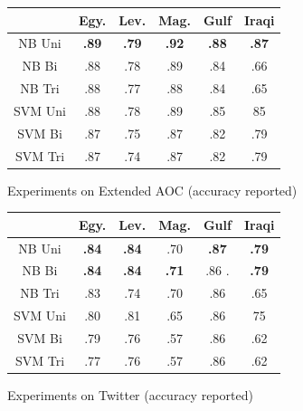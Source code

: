 \documentclass[10pt, a4paper]{article}
\begin{document}
\begin{figure} \centering
\begin{tabular}{|c|c|c|c|c|c|} \hline & Egy. & Lev. & Mag. & Gulf &
Iraqi \\ \hline NB Uni & \textbf{.89} & \textbf{.79} & \textbf{.92} &
\textbf{.88} & \textbf{.87} \\ \hline NB Bi & .88 & .78 & .89 & .84 &
.66 \\ \hline NB Tri & .88 & .77 & .88 & .84 & .65 \\ \hline SVM Uni &
.88 & .78 & .89 & .85 & 85 \\ \hline SVM Bi & .87 & .75 & .87 & .82 &
.79\\ \hline SVM Tri & .87 & .74 & .87 & .82 & .79 \\ \hline
\end{tabular}
\label{exp:newspaper}
\caption{Experiments on Extended AOC (accuracy reported)}
\end{figure}

\begin{figure} \centering
\begin{tabular}{|c|c|c|c|c|c|} \hline & Egy. & Lev. & Mag. & Gulf &
Iraqi \\ \hline NB Uni & \textbf{.84} & \textbf{.84} & .70 &
\textbf{.87} & \textbf{.79} \\ \hline NB Bi & \textbf{.84} &
\textbf{.84} & \textbf{.71} & .86 .& \textbf{.79} \\ \hline NB Tri &
.83 & .74 & .70 & .86 & .65 \\ \hline SVM Uni & .80 & .81 & .65 & .86
& 75 \\ \hline SVM Bi & .79 & .76 & .57 & .86 & .62\\ \hline SVM Tri &
.77 & .76 & .57 & .86 & .62 \\ \hline
\end{tabular}
\label{exp:twitter}
\caption{Experiments on Twitter (accuracy reported)}
\end{figure}
\end{document}
